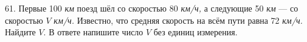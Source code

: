 61. Первые 100 {\it км} поезд шёл со скоростью 80 {\it км/ч,} а следующие 50 {\it км} --- со скоростью $V$ {\it км/ч.} Известно, что средняя скорость на всём пути равна 72 {\it км/ч.} Найдите $V.$ В ответе напишите число $V$ без единиц измерения.\\
